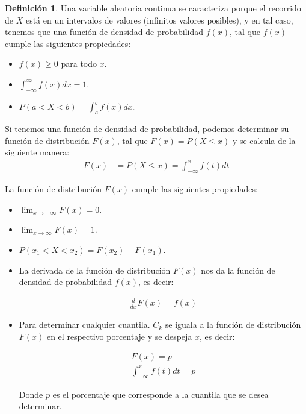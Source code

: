 \documentclass{article}
\theoremstyle{definition}
\newtheorem{definition}{Definición}[section]
\theoremstyle{plain}
\theoremstyle{remark}
\begin{document}
\begin{definition}
Una variable aleatoria continua se caracteriza porque el recorrido de $X$ está en un intervalos de valores (infinitos valores posibles), y en tal caso, tenemos que una función de densidad de probabilidad $f(x)$, tal que $f(x)$ cumple las siguientes propiedades:

\begin{itemize}
    \item $f(x) \geq 0$ para todo $x$.
    \item $\int_{-\infty}^{\infty} f(x) dx = 1$.
    \item $P(a < X < b) = \int_{a}^{b} f(x) dx$.
\end{itemize}
\end{definition}

Si tenemos una función de densidad de probabilidad, podemos determinar su función de distribución $F(x)$, tal que $F(x) = P(X \leq x)$ y se calcula de la siguiente manera:
\begin{align*}
F(x) &= P(X \leq x) = \int_{-\infty}^{x} f(t) dt
\end{align*}

La función de distribución $F(x)$ cumple las siguientes propiedades:
\begin{itemize}
\item $\lim_{x \to -\infty} F(x) = 0$.
\item $\lim_{x \to \infty} F(x) = 1$.
\item $P(x_1 < X < x_2) = F(x_2) - F(x_1)$.
\item La derivada de la función de distribución $F(x)$ nos da la función de densidad de probabilidad $f(x)$, es decir:

\begin{align*}
\frac{d}{dx} F(x) = f(x)
\end{align*}

\item Para determinar cualquier cuantila. $C_k$ se iguala a la función de distribución $F(x)$ en el respectivo porcentaje y se despeja $x$, es decir:

\begin{align*}
F(x) = p \\
\int_{-\infty}^{x} f(t) dt = p
\end{align*}

Donde $p$ es el porcentaje que corresponde a la cuantila que se desea determinar.

\end{itemize}
\end{document}
